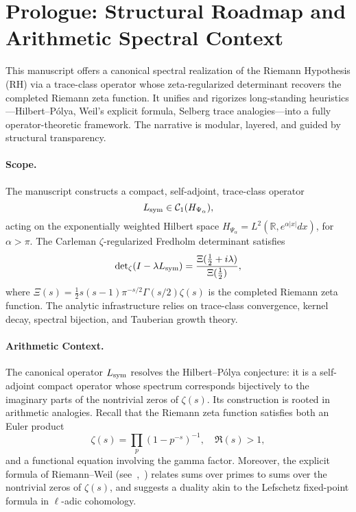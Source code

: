\section{Prologue: Structural Roadmap and Arithmetic Spectral Context}
\label{sec:prologue}

\medskip

\noindent
This manuscript offers a canonical spectral realization of the Riemann Hypothesis (RH) via a trace-class operator whose zeta-regularized determinant recovers the completed Riemann zeta function. It unifies and rigorizes long-standing heuristics—Hilbert--Pólya, Weil's explicit formula, Selberg trace analogies—into a fully operator-theoretic framework. The narrative is modular, layered, and guided by structural transparency.

\paragraph*{Scope.} The manuscript constructs a compact, self-adjoint, trace-class operator
\[
L_{\mathrm{sym}} \in \mathcal{C}_1(H_{\Psi_\alpha}),
\]
acting on the exponentially weighted Hilbert space \( H_{\Psi_\alpha} = L^2(\mathbb{R}, e^{\alpha|x|} dx) \), for \( \alpha > \pi \). The Carleman \(\zeta\)-regularized Fredholm determinant satisfies
\[
\det\nolimits_{\zeta}(I - \lambda L_{\mathrm{sym}}) = \frac{\Xi(\tfrac{1}{2} + i\lambda)}{\Xi(\tfrac{1}{2})},
\]
where \( \Xi(s) = \tfrac{1}{2}s(s-1)\pi^{-s/2}\Gamma(s/2)\zeta(s) \) is the completed Riemann zeta function. The analytic infrastructure relies on trace-class convergence, kernel decay, spectral bijection, and Tauberian growth theory.

\paragraph*{Arithmetic Context.} The canonical operator \( L_{\mathrm{sym}} \) resolves the Hilbert--Pólya conjecture: it is a self-adjoint compact operator whose spectrum corresponds bijectively to the imaginary parts of the nontrivial zeros of \( \zeta(s) \). Its construction is rooted in arithmetic analogies. Recall that the Riemann zeta function satisfies both an Euler product
\[
\zeta(s) = \prod_p \left(1 - p^{-s}\right)^{-1}, \quad \Re(s) > 1,
\]
and a functional equation involving the gamma factor. Moreover, the explicit formula of Riemann--Weil (see~\cite[Chap.~17]{Titchmarsh1986Zeta},~\cite[Chap.~5]{IwaniecKowalski}) relates sums over primes to sums over the nontrivial zeros of \( \zeta(s) \), and suggests a duality akin to the Lefschetz fixed-point formula in \(\ell\)-adic cohomology.

